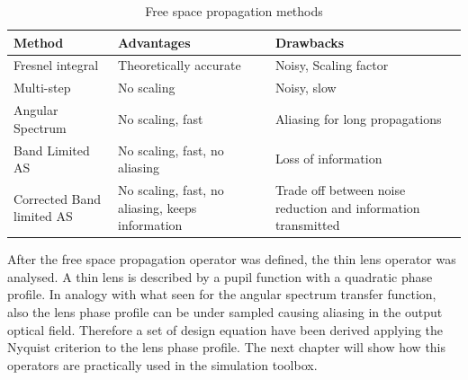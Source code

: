 \begin{table}
	\centering
	\label{tab:methods}
	\begin{tabular} { l | p{4cm} | p{4cm}}
		Method & Advantages & Drawbacks\\ \hline
		Fresnel integral & Theoretically accurate & Noisy, Scaling factor \\ \hline
		Multi-step & No scaling & Noisy, slow \\ \hline
		Angular Spectrum & No scaling, fast & Aliasing for long propagations \\ \hline
		Band Limited AS & No scaling, fast, no aliasing & Loss of information \\ \hline
		Corrected Band limited AS & No scaling, fast, no aliasing, keeps information & Trade off between  noise reduction and information transmitted\\ \hline
		
		
	\end{tabular}
	\caption{Free space propagation methods}
\end{table}
	
After the free space propagation operator was defined, the thin lens operator was analysed. A thin lens is described by a pupil function with a quadratic phase profile. In analogy with what seen for the angular spectrum transfer function, also the lens phase profile can be under sampled causing aliasing in the output optical field. Therefore a set of design equation have been derived applying the Nyquist criterion to the lens phase profile.
The next chapter will show how this operators are practically used in the simulation toolbox.
 
